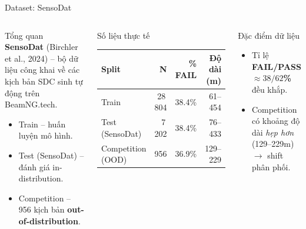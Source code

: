 \documentclass[aspectratio=169,10pt]{beamer}
\begin{document}
\begin{frame}{Dataset: SensoDat}
\begin{columns}[T]
\begin{block}{Tổng quan}
\scriptsize
\textbf{SensoDat} (Birchler et al., 2024) -- bộ dữ liệu công khai về các kịch bản SDC sinh tự động trên BeamNG.tech.
\begin{itemize}
    \item Train -- huấn luyện mô hình.
    \item Test (SensoDat) -- đánh giá in-distribution.
    \item Competition -- 956 kịch bản \textbf{out-of-distribution}.
\end{itemize}
\end{block}

\begin{block}{Số liệu thực tế}
\centering\scriptsize
\begin{tabular}{l r r r}
\toprule
\textbf{Split} & \textbf{N} & \textbf{\% FAIL} & \textbf{Độ dài (m)} \\
\midrule
Train             & 28\,804 & 38.4\%        & 61--454 \\
Test (SensoDat)   &  7\,202 & 38.4\%        & 76--433 \\
Competition (OOD) &     956 & \alert{36.9\%}& 129--229 \\
\bottomrule
\end{tabular}
\end{block}

\begin{exampleblock}{Đặc điểm dữ liệu}
\scriptsize
\begin{itemize}
    \item Tỉ lệ \textbf{FAIL/PASS $\approx 38/62$\%} đều khắp.
    \item Competition có khoảng độ dài \emph{hẹp hơn} (129--229m) $\to$ shift phân phối.
\end{itemize}
\end{exampleblock}
\end{columns}
\end{frame}
\end{document}

